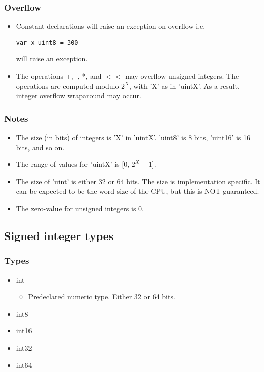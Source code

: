 \documentclass{article}
\begin{document}
		\subsubsection{Overflow}
			\begin{itemize}
				\item Constant declarations will raise an exception on overflow i.e. \begin{verbatim}var x uint8 = 300\end{verbatim} will raise an exception.
				\item The operations +, -, *, and \(<<\) may overflow unsigned integers. The operations are computed modulo \(2^X\), with 'X' as in 'uintX'. As a result, integer overflow wraparound may occur. 
			\end{itemize}
		\subsubsection{Notes}
			\begin{itemize}
				\item The size (in bits) of integers is 'X' in 'uintX'. 'uint8' is 8 bits, 'uint16' is 16 bits, and so on. 
				\item The range of values for 'uintX' is [0, \(2^X - 1\)].
				\item The size of 'uint' is either 32 or 64 bits. The size is implementation specific. It can be expected to be the word size of the CPU, but this is NOT guaranteed.
				\item The zero-value for unsigned integers is \colorbox{code}{0}.
			\end{itemize} 
			
			
    	\subsection{Signed integer types}
			\subsubsection{Types}
			\begin{itemize}
    				\item int
					\begin{itemize}
						\item Predeclared numeric type. Either 32 or 64 bits. 
					\end{itemize}
    				\item int8
    				\item int16
   	 			\item int32
  	  			\item int64
			\end{itemize}
\end{document}
